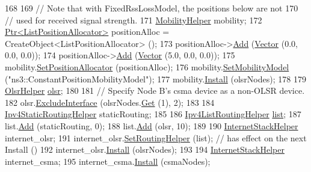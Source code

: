 \begin{DoxyCode}
168 
169   \textcolor{comment}{// Note that with FixedRssLossModel, the positions below are not}
170   \textcolor{comment}{// used for received signal strength.}
171   \hyperlink{classns3_1_1MobilityHelper}{MobilityHelper} mobility;
172   \hyperlink{classns3_1_1Ptr}{Ptr<ListPositionAllocator>} positionAlloc = CreateObject<ListPositionAllocator> 
      ();
173   positionAlloc->\hyperlink{classns3_1_1ListPositionAllocator_a460e82f015ac012a73ba0ea0cccb3486}{Add} (\hyperlink{classns3_1_1Vector3D_a7e59b47bc94c9cb1dadff68c1d0112d8}{Vector} (0.0, 0.0, 0.0));
174   positionAlloc->\hyperlink{classns3_1_1ListPositionAllocator_a460e82f015ac012a73ba0ea0cccb3486}{Add} (\hyperlink{classns3_1_1Vector3D_a7e59b47bc94c9cb1dadff68c1d0112d8}{Vector} (5.0, 0.0, 0.0));
175   mobility.\hyperlink{classns3_1_1MobilityHelper_ac59d5295076be3cc11021566713a28c5}{SetPositionAllocator} (positionAlloc);
176   mobility.\hyperlink{classns3_1_1MobilityHelper_a030275011b6f40682e70534d30280aba}{SetMobilityModel} (\textcolor{stringliteral}{"ns3::ConstantPositionMobilityModel"});
177   mobility.\hyperlink{classns3_1_1MobilityHelper_a07737960ee95c0777109cf2994dd97ae}{Install} (olsrNodes);
178 
179   \hyperlink{classns3_1_1OlsrHelper}{OlsrHelper} \hyperlink{namespaceolsr}{olsr};
180 
181   \textcolor{comment}{// Specify Node B's csma device as a non-OLSR device.}
182   olsr.\hyperlink{classns3_1_1OlsrHelper_a22808d14d002eb691aef05b4d20e997b}{ExcludeInterface} (olsrNodes.\hyperlink{classns3_1_1NodeContainer_a9ed96e2ecc22e0f5a3d4842eb9bf90bf}{Get} (1), 2);
183 
184   \hyperlink{classns3_1_1Ipv4StaticRoutingHelper}{Ipv4StaticRoutingHelper} staticRouting;
185 
186   \hyperlink{classns3_1_1Ipv4ListRoutingHelper}{Ipv4ListRoutingHelper} \hyperlink{openflow-interface_8h_afd9bcfa176617760671b67580f536fa7}{list};
187   list.\hyperlink{classns3_1_1Ipv4ListRoutingHelper_a697287d45297478735082f691ad06fa3}{Add} (staticRouting, 0);
188   list.\hyperlink{classns3_1_1Ipv4ListRoutingHelper_a697287d45297478735082f691ad06fa3}{Add} (olsr, 10);
189 
190   \hyperlink{classns3_1_1InternetStackHelper}{InternetStackHelper} internet\_olsr;
191   internet\_olsr.\hyperlink{classns3_1_1InternetStackHelper_a3e382c02df022dec79952a7eca8cd5ba}{SetRoutingHelper} (list); \textcolor{comment}{// has effect on the next Install ()}
192   internet\_olsr.\hyperlink{classns3_1_1InternetStackHelper_a6645b412f31283d2d9bc3d8a95cebbc0}{Install} (olsrNodes);
193 
194   \hyperlink{classns3_1_1InternetStackHelper}{InternetStackHelper} internet\_csma;
195   internet\_csma.\hyperlink{classns3_1_1InternetStackHelper_a6645b412f31283d2d9bc3d8a95cebbc0}{Install} (csmaNodes);

\end{DoxyCode}
